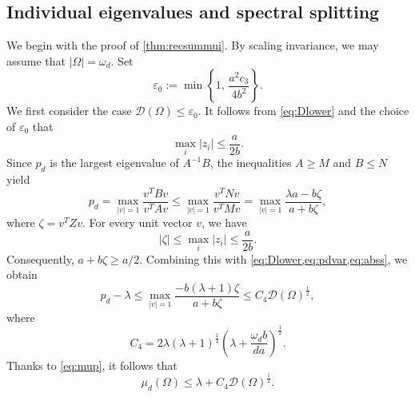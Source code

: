 \documentclass{amsart}
\numberwithin{equation}{section}
\theoremstyle{plain}
\theoremstyle{definition}
\theoremstyle{plain}
\theoremstyle{remark}
\numberwithin{figure}{section}
\newcommand{\D}{\mathcal{D}(\Omega)}
\begin{document}
\subsection{Individual eigenvalues and spectral splitting}

We begin with the proof of \cref{thm:recsummui}. By scaling invariance, we may assume that $|\Omega|=\omega_d$. Set
\begin{equation}
    \label{eq:epsilon1}
    \varepsilon_0 := \min\left\{ 1,\, \frac{a^2c_3}{4b^2} \right\}.
\end{equation}
We first consider the case $\D\leq \varepsilon_0$. It follows from \cref{eq:Dlower} and the choice of $\varepsilon_0$ that
\begin{equation}
    \label{eq:ziabbound}
    \max_{i}|z_i| \leq \frac{a}{2b}.
\end{equation}
Since $p_d$ is the largest eigenvalue of $A^{-1}B$, the inequalities $A\geq M$ and $B\leq N$ yield
\begin{equation}
    \label{eq:pdvar}
    p_d = \max_{|v|=1} \frac{v^T Bv}{v^T Av} \leq \max_{|v|=1} \frac{v^T N v}{v^T M v} = \max_{|v|=1}\frac{\lambda a-b\zeta}{a+b\zeta},
\end{equation}
where $\zeta=v^TZv$. For every unit vector $v$, we have
\begin{equation}
    \label{eq:abss}
    |\zeta|\leq \max_{i}|z_i| \leq \frac{a}{2b}.
\end{equation}
Consequently, $a+b\zeta\geq a/2$. Combining this with \cref{eq:Dlower,eq:pdvar,eq:abss}, we obtain
\[
    p_d-\lambda \leq \max_{|v|=1}\frac{-b(\lambda+1)\zeta}{a+b\zeta} \leq C_4 \D^{\frac{1}{2}},
\]
where
\[
    C_4= 2\lambda(\lambda+1)^{\frac{1}{2}}\left(\lambda +\frac{\omega_d b}{da}\right)^{\frac{1}{2}} .%
\]
Thanks to \cref{eq:mup}, it follows that
\begin{equation}
    \label{eq:mudupper}
    \mu_d(\Omega) \leq \lambda+C_4\D^{\frac{1}{2}}.
\end{equation}
\end{document}
